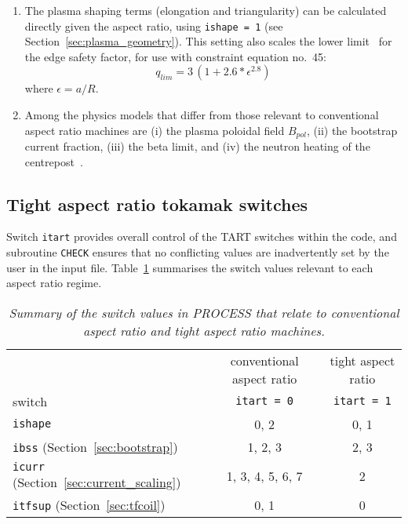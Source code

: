 \documentclass[11pt,a4paper]{report}
\newcommand{\process}{\mbox{\texttt{PROCESS}}}
\begin{document}
\begin{enumerate}
\item The plasma shaping terms (elongation and triangularity) can be
  calculated directly given the aspect ratio, using \texttt{ishape = 1} (see
  Section~\ref{sec:plasma_geometry}). This setting also scales the lower
  limit~\cite{storac} for the edge safety factor, for use with constraint
  equation no.\ 45:
  \begin{equation}
    q_{lim} = 3 \, (1 + 2.6*\epsilon^{2.8})
  \end{equation}
  where $\epsilon = a/R$. 

\item Among the physics models that differ from those relevant to conventional
  aspect ratio machines are (i) the plasma poloidal field $B_{pol}$, (ii) the
  bootstrap current fraction, (iii) the beta limit, and (iv) the neutron
  heating of the centrepost~\cite{storac}.

\end{enumerate}

\subsection{Tight aspect ratio tokamak switches}

Switch \texttt{itart} provides overall control of the TART switches within the
code, and subroutine \texttt{CHECK} ensures that no conflicting values are
inadvertently set by the user in the input file. Table~\ref{tab:tart}
summarises the switch values relevant to each aspect ratio regime.
\begin{table}[tbph]
\begin{center}
  \begin{tabular}{||l|c|c||} \hline
    & conventional aspect ratio & tight aspect ratio \\
    switch & \texttt{itart = 0} & \texttt{itart = 1} \\ \hline
    \texttt{ishape} & 0, 2 & 0, 1 \\
    \texttt{ibss} (Section~\ref{sec:bootstrap}) & 1, 2, 3 & 2, 3 \\
    \texttt{icurr} (Section~\ref{sec:current_scaling}) & 1, 3, 4, 5, 6, 7 & 2 \\
    \texttt{itfsup} (Section~\ref{sec:tfcoil}) & 0, 1 & 0 \\
    \hline
\end{tabular}
\end{center}
\caption[\process\ switches for tight aspect ratio machines]
{\label{tab:tart}
  \textit{Summary of the switch values in PROCESS that relate to
    conventional aspect ratio and tight aspect ratio machines.}
}
\end{table}
\end{document}
